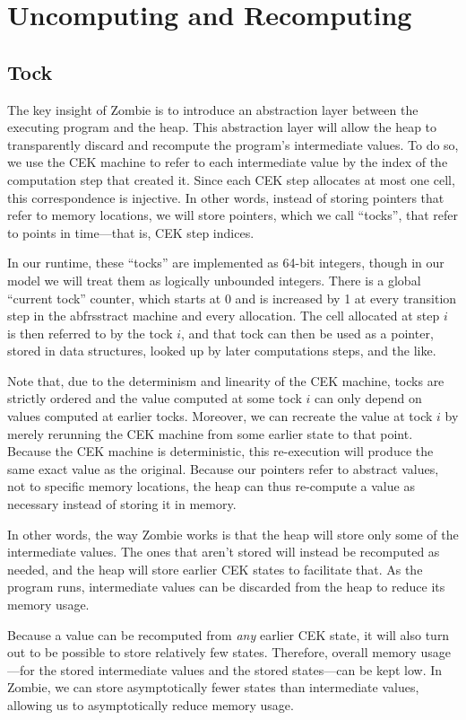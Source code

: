 \section{Uncomputing and Recomputing}
\subsection{Tock}
The key insight of Zombie is to introduce an abstraction layer between the executing program and the heap. This abstraction layer will allow the heap to transparently discard and recompute the program's intermediate values. To do so, we use the CEK machine to refer to each intermediate value by the index of the computation step that created it. Since each CEK step allocates at most one cell, this correspondence is injective. In other words, instead of storing pointers that refer to memory locations, we will store pointers, which we call ``tocks'', that refer to points in time---that is, CEK step indices.

In our runtime, these ``tocks'' are implemented as 64-bit integers, though in our model we will treat them as logically unbounded integers. There is a global ``current tock'' counter, which starts at 0 and is increased by 1 at every transition step in the abfrsstract machine and every allocation. The cell allocated at step $i$ is then referred to by the tock $i$, and that tock can then be used as a pointer, stored in data structures, looked up by later computations steps, and the like.

Note that, due to the determinism and linearity of the CEK machine, tocks are strictly ordered and the value computed at some tock $i$ can only depend on values computed at earlier tocks. Moreover, we can recreate the value at tock $i$ by merely rerunning the CEK machine from some earlier state to that point. Because the CEK machine is deterministic, this re-execution will produce the same exact value as the original. Because our pointers refer to abstract values, not to specific memory locations, the heap can thus re-compute a value as necessary instead of storing it in memory.

In other words, the way Zombie works is that the heap will store only some of the intermediate values. The ones that aren't stored will instead be recomputed as needed, and the heap will store earlier CEK states to facilitate that. As the program runs, intermediate values can be discarded from the heap to reduce its memory usage.

Because a value can be recomputed from \emph{any} earlier CEK state, it will also turn out to be possible to store relatively few states. Therefore, overall memory usage---for the stored intermediate values and the stored states---can be kept low. In Zombie, we can store asymptotically fewer states than intermediate values, allowing us to asymptotically reduce memory usage.


